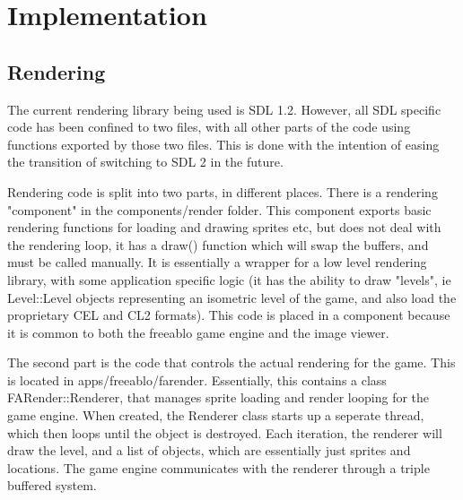 \section{Implementation}

 \subsection{Rendering}
    The current rendering library being used is SDL 1.2. However, all SDL specific code has been confined to two files, with all other parts of the code using functions exported by those two files. This is done with the intention of easing the transition of switching to SDL 2 in the future.
    
    Rendering code is split into two parts, in different places. There is a rendering "component" in the components/render folder.
    This component exports basic rendering functions for loading and drawing sprites etc, but does not deal with the rendering loop, it has a draw() function which will swap the buffers, and must be called manually.   
    It is essentially a wrapper for a low level rendering library, with some application specific logic (it has the ability to draw "levels", ie Level::Level objects representing an isometric level of the game, and also load the proprietary CEL and CL2 formats).
    This code is placed in a component because it is common to both the freeablo game engine and the image viewer.
    
    \mbox{}
    
    The second part is the code that controls the actual rendering for the game. This is located in apps/freeablo/farender. Essentially, this contains a class FARender::Renderer, that manages sprite loading and render looping for the game engine.  
    When created, the Renderer class starts up a seperate thread, which then loops until the object is destroyed. Each iteration, the renderer will draw the level, and a list of objects, which are essentially just sprites and locations.
    The game engine communicates with the renderer through a triple buffered system.
    

